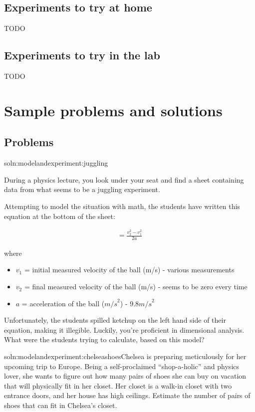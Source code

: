 \subsection{Experiments to try at home}
TODO
\subsection{Experiments to try in the lab}
TODO
\section{Sample problems and solutions}
\subsection{Problems}
\begin{problem}{soln:modelandexperiment:juggling}{\label{prob:modelandexperiment:juggling}During a physics lecture, you look under your seat and find a sheet containing data from what seems to be a juggling experiment.

Attempting to model the situation with math, the students have written this equation at the bottom of the sheet: 

\begin{align*}
=\frac{v_2^{2}-v_1^{2}}{2a}
\end{align*}

where 
\begin{itemize}
\item $v_1$ = initial measured velocity of the ball (m/s) - various measurements
\item $v_2$ = final measured velocity of the ball (m/s) - seems to be zero every time 
\item $a$ = acceleration of the ball (${m/s}^{2}$) - $9.8 {m/s}^{2}$
\end{itemize}

Unfortunately, the students spilled ketchup on the left hand side of their equation, making it illegible. Luckily, you're proficient in dimensional analysis. What were the students trying to calculate, based on this model?}
\end{problem}

\begin{problem}{soln:modelandexperiment:chelseashoes}{\label{prob:modelandexperiment:chelseashoes}Chelsea is preparing meticulously for her upcoming trip to Europe. Being a self-proclaimed ``shop-a-holic'' and physics lover, she wants to figure out how many pairs of shoes she can buy on vacation that will physically fit in her closet. Her closet is a walk-in closet with two entrance doors, and her house has high ceilings. Estimate the number of pairs of shoes that can fit in Chelsea's closet.}
\end{problem}

